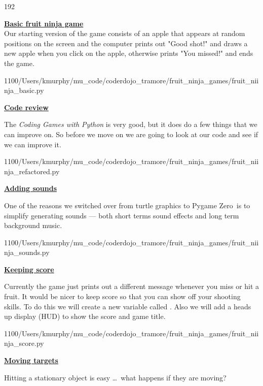 \documentclass{coderdojo}
\def\MUcode{/Users/kmurphy/mu_code/coderdojo_tramore/fruit_ninja_games/}
\def\pygameZero{{\pygameZeroFont Pygame Zero}}
\newcommand\contentsitem[2]{
	\item \hyperref[#1]{\color{section}\bfseries #2}
}
\begin{document}
\maketitle

\begin{dingautolist}{192} 
\contentsitem{ball}{Basic fruit ninja game}\\
Our starting version of the game consists of an apple that appears at random positions on the screen and the computer prints out  "Good shot!" and draws a new apple when you click on the apple, otherwise prints "You missed!" and ends the game.

	{1}{100}{\MUcode}{fruit_niinja_basic.py}  
	
\clearpage

\contentsitem{review}{Code review}

The {\em Coding Games with Python} is very good, but it does do a few things that we can improve on. So before we move on we are going to look at our code and see if we can improve it.

	{1}{100}{\MUcode}{fruit_niinja_refactored.py}  
	
\clearpage

\contentsitem{rectangle}{Adding sounds}

One of the reasons we switched over from turtle graphics to \pygameZero\ is to simplify generating sounds --- both short terms sound effects and long term background music. 

	{1}{100}{\MUcode}{fruit_niinja_sounds.py}  
	
\clearpage

\contentsitem{rectangle}{Keeping score}

Currently the game just prints out a different message whenever you miss or hit a fruit. It would be nicer to keep score so that you can show off your shooting skills.  To do this we will create a new variable called .  Also we will add a heads up display (HUD) to show the score and game title.    

	{1}{100}{\MUcode}{fruit_niinja_score.py}  
	
\clearpage

\contentsitem{rectangle}{Moving targets}

Hitting a stationary object is easy \ldots\ what happens if they are moving?


\end{dingautolist}
\end{document}
